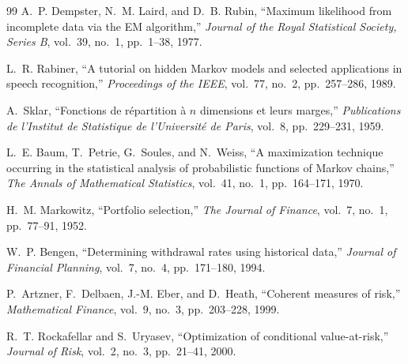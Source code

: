 \documentclass[fleqn,12pt]{report}
\begin{document}
\begin{thebibliography}{99}
A.~P. Dempster, N.~M. Laird, and D.~B. Rubin,
``Maximum likelihood from incomplete data via the EM algorithm,''
\textit{Journal of the Royal Statistical Society, Series B},
vol.~39, no.~1, pp.~1--38, 1977.

L.~R. Rabiner,
``A tutorial on hidden Markov models and selected applications in speech recognition,''
\textit{Proceedings of the IEEE}, vol.~77, no.~2, pp.~257--286, 1989.

A.~Sklar,
``Fonctions de r\'epartition \`a $n$ dimensions et leurs marges,''
\textit{Publications de l'Institut de Statistique de l'Universit\'e de Paris},
vol.~8, pp.~229--231, 1959.

L.~E. Baum, T.~Petrie, G.~Soules, and N.~Weiss,
``A maximization technique occurring in the statistical analysis of probabilistic
functions of Markov chains,''
\textit{The Annals of Mathematical Statistics}, vol.~41, no.~1, pp.~164--171, 1970.

H.~M. Markowitz,
``Portfolio selection,''
\textit{The Journal of Finance}, vol.~7, no.~1, pp.~77--91, 1952.

W.~P. Bengen,
``Determining withdrawal rates using historical data,''
\textit{Journal of Financial Planning}, vol.~7, no.~4, pp.~171--180, 1994.

P.~Artzner, F.~Delbaen, J.-M. Eber, and D.~Heath,
``Coherent measures of risk,''
\textit{Mathematical Finance}, vol.~9, no.~3, pp.~203--228, 1999.

R.~T. Rockafellar and S.~Uryasev,
``Optimization of conditional value-at-risk,''
\textit{Journal of Risk}, vol.~2, no.~3, pp.~21--41, 2000.

\end{thebibliography}
\end{document}
